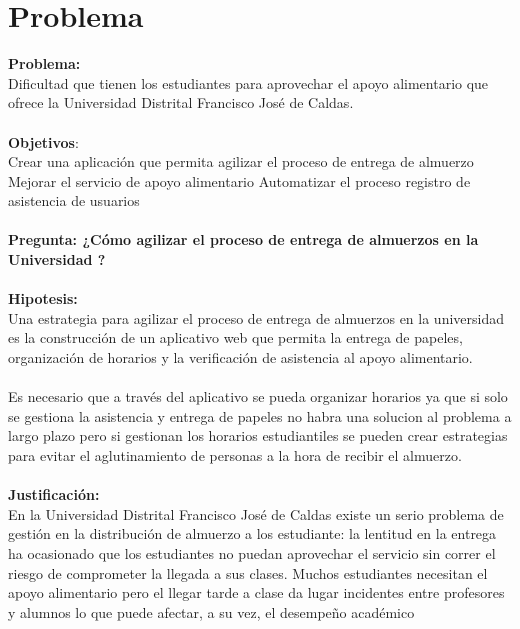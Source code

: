 \chapter{Problema}


\textbf{Problema:}
\\
Dificultad que tienen los estudiantes para aprovechar el apoyo alimentario que ofrece la Universidad Distrital Francisco José de Caldas. 
\\
\\
\textbf{Objetivos}:
\\
Crear una aplicación que permita agilizar el proceso de entrega de almuerzo
Mejorar el servicio de apoyo alimentario 
Automatizar el proceso registro de asistencia de usuarios
\\
\\
\textbf{Pregunta: ¿Cómo agilizar el proceso de entrega de almuerzos en la Universidad ?}
\\
\\
\textbf{Hipotesis:} 
\\
Una estrategia para agilizar el proceso de entrega de almuerzos en la universidad es la construcción de un aplicativo web que permita la entrega de papeles, organización de horarios y la verificación de asistencia al apoyo alimentario.
\\
\\
Es necesario que a través del aplicativo se pueda organizar horarios ya que si solo se gestiona la asistencia y entrega de papeles no habra una solucion al problema a largo plazo pero si gestionan los horarios estudiantiles se pueden crear estrategias para evitar el aglutinamiento de personas a la hora de recibir el almuerzo.
\\
\\
\clearpage
\textbf{Justificación:}
\\ 
En la Universidad Distrital Francisco José de Caldas existe un serio problema de gestión en la distribución de almuerzo a los estudiante:  la lentitud en la entrega ha ocasionado que los estudiantes no puedan aprovechar el servicio sin correr el riesgo de comprometer la llegada a sus clases. Muchos estudiantes necesitan el apoyo alimentario pero el llegar tarde a clase da lugar incidentes entre profesores y alumnos lo que  puede afectar, a su vez, el desempeño académico




        
